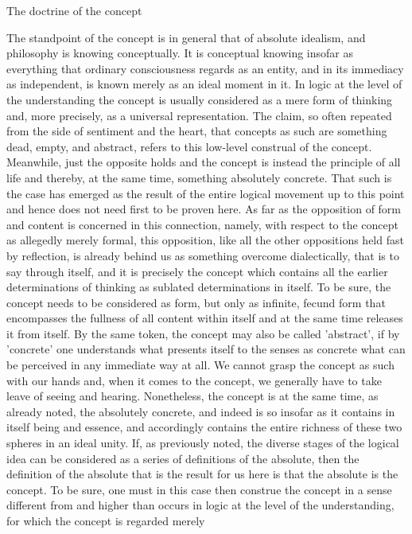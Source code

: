 
The doctrine of the concept

The standpoint of the concept is in general that of absolute idealism,
and philosophy is knowing conceptually.
It is conceptual knowing insofar as everything that ordinary consciousness
regards as an entity, and in its immediacy as independent, is known merely as
an ideal moment in it.
In logic at the level of the understanding the concept is
usually considered as a mere form of thinking and,
more precisely, as a universal representation.
The claim, so often repeated from the side of sentiment and the heart,
that concepts as such are something dead, empty, and abstract, refers to
this low-level construal of the concept.
Meanwhile, just the opposite holds and the concept is instead the principle of
all life and thereby, at the same time, something absolutely concrete.
That such is the case has emerged as the result of the entire logical movement
up to this point and hence does not need first to be proven here.
As far as the opposition of form and content is concerned in this connection,
namely, with respect to the concept as allegedly merely formal,
this opposition, like all the other oppositions held fast by reflection, is already
behind us as something overcome dialectically, that is to say through itself, and it
is precisely the concept which contains all the earlier determinations of thinking as
sublated determinations in itself.
To be sure, the concept needs to be considered as form,
but only as infinite, fecund form that encompasses the fullness of all content
within itself and at the same time releases it from itself.
By the same token, the concept may also be called 'abstract',
if by 'concrete' one understands what presents itself to the senses as concrete
what can be perceived in any immediate way at all.
We cannot grasp the concept as such with our hands and, when it comes to
the concept, we generally have to take leave of seeing and hearing.
Nonetheless, the concept is at the same time, as already noted, the absolutely concrete, and
indeed is so insofar as it contains in itself being and essence, and accordingly
contains the entire richness of these two spheres in an ideal unity.
If, as previously noted, the diverse stages of the logical idea can be considered as a
series of definitions of the absolute, then the definition of the absolute
that is the result for us here is that the absolute is the concept.
To be sure, one must in this case then construe the concept in a sense different from and higher than occurs in
logic at the level of the understanding, for which the concept is regarded merely
